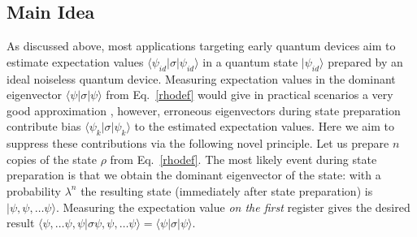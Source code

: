 \documentclass[aps,prx,showpacs,twocolumn,reprint]{revtex4-2}
\begin{document}
\subsection{Main Idea}

As discussed above, most applications targeting early
quantum devices aim to estimate expectation values  $\langle\psi_{id} | \sigma | \psi_{id} \rangle$
in a quantum state $| \psi_{id} \rangle$ prepared by an ideal noiseless quantum device. Measuring expectation values in the
dominant eigenvector $\langle\psi | \sigma | \psi \rangle$ from Eq.~\ref{rhodef} would give in practical scenarios a very good
approximation \cite{koczor2021dominant}, however, erroneous eigenvectors during state preparation contribute bias $\langle\psi_k | \sigma | \psi_k \rangle$
to the estimated expectation values. Here we aim to suppress these contributions
via the following novel principle. Let us prepare $n$ copies of the state $\rho$
from Eq.~\eqref{rhodef}.
The most likely event during state preparation is that we obtain the dominant eigenvector of the state:
with a probability $\lambda^n$ the resulting state (immediately after state preparation) is $|\psi, \psi,  \dots \psi \rangle$.
Measuring
the expectation value \emph{on the first} register gives the desired result
$\langle \psi, \dots \psi, \psi | \sigma \psi, \psi,  \dots \psi \rangle = \langle\psi | \sigma | \psi \rangle$.
\end{document}
